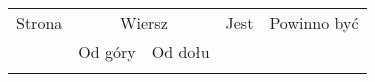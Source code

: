 \documentclass[a4paper,11pt]{article}
\begin{document}
\begin{center}

  \begin{tabular}{|c|c|c|c|c|}
    \hline
    Strona & \multicolumn{2}{c|}{Wiersz} & Jest
                              & Powinno być \\ \cline{2-3}
    & Od góry & Od dołu & & \\
    \hline
    & & & & \\
    \hline
  \end{tabular}






\end{center}
\end{document}
